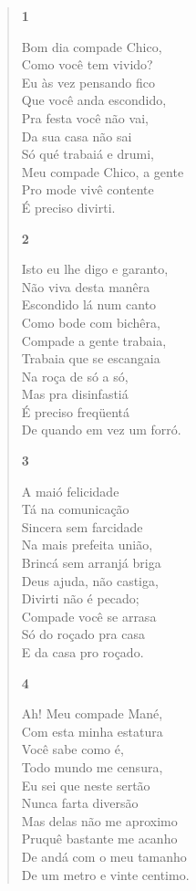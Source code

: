 \begin{verse}
\textbf{1}

Bom dia compade Chico,\\
Como você tem vivido?\\
Eu às vez pensando fico\\
Que você anda escondido,\\
Pra festa você não vai,\\
Da sua casa não sai\\
Só qué trabaiá e drumi,\\
Meu compade Chico, a gente\\
Pro mode vivê contente\\
É preciso divirti.

\textbf{2}

Isto eu lhe digo e garanto,\\
Não viva desta manêra\\
Escondido lá num canto\\
Como bode com bichêra,\\
Compade a gente trabaia,\\
Trabaia que se escangaia\\
Na roça de só a só,\\
Mas pra disinfastiá\\
É preciso freqüentá\\
De quando em vez um forró.

\textbf{3}

A maió felicidade\\
Tá na comunicação\\
Sincera sem farcidade\\
Na mais prefeita união,\\
Brincá sem arranjá briga\\
Deus ajuda, não castiga,\\
Divirti não é pecado;\\
Compade você se arrasa\\
Só do roçado pra casa\\
E da casa pro roçado.

\textbf{4}

Ah! Meu compade Mané,\\
Com esta minha estatura\\
Você sabe como é,\\
Todo mundo me censura,\\
Eu sei que neste sertão\\
Nunca farta diversão\\
Mas delas não me aproximo\\
Pruquê bastante me acanho\\
De andá com o meu tamanho\\
De um metro e vinte centimo.


\end{verse}
